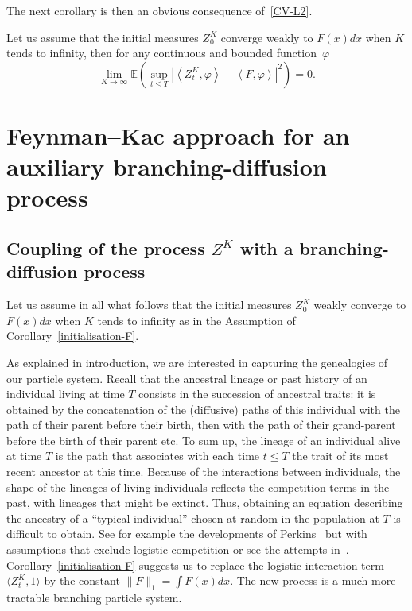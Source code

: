 \documentclass[10pt]{amsart}
\theoremstyle{definition}\newtheorem{defi}[theo]{Definition}\newtheorem{rema}[theo]{Remark}\newtheorem{exam}[theo]{Example}\newtheorem{exem}[theo]{Example}\newtheorem{nota}[theo]{Notation}
\newcommand*\E{\mathbb{E}}
\begin{document}
The next corollary is then an obvious consequence of~\eqref{CV-L2}.
\begin{coro}\label{initialisation-F}
Let us assume that the initial measures $Z^{K}_{0}$ converge weakly to $F(x)dx$ when $K$ tends to infinity, then for any continuous and bounded function~$\varphi$
\begin{equation}\label{CV-F}
\lim_{K \to \infty}\E\left(\sup_{t \le T} \left|\left\langle Z^{K}_{t},\varphi\right\rangle - \left\langle F,\varphi\right\rangle\right|^2\right) = 0.
\end{equation}
\end{coro}

\section{Feynman--Kac approach for an auxiliary branching-diffusion process}\label{sec:Feynman-Kac}
\subsection{Coupling of the process \texorpdfstring{$Z^K$}{ZK} with a branching-diffusion process}\label{sec:coupling}


Let us assume in all what follows that the initial measures $Z^{K}_{0}$ weakly converge to $F(x)dx$ when $K$ tends to infinity as in the Assumption of Corollary~\ref{initialisation-F}.


As explained in introduction, we are interested in capturing the genealogies of our particle system. Recall that the ancestral lineage or past history of an individual living at time $T$ consists in the succession of ancestral traits: it is obtained by the concatenation of the (diffusive) paths of this individual with the path of their parent before their birth, then with the path of their grand-parent before the birth of their parent etc. To sum up, the lineage of an individual alive at time $T$ is the path that associates with each time $t\leq T$ the trait of its most recent ancestor at this time. Because of the interactions between individuals, the shape of the lineages of living individuals reflects the competition terms in the past, with lineages that might be extinct. Thus, obtaining an equation describing the ancestry of a ``typical individual'' chosen at random in the population at $T$ is difficult to obtain. See for example the developments of Perkins~\cite{perkinsAMS} but with assumptions that exclude logistic competition or see the attempts in~\cite{meleardtran_suphist}. Corollary~\ref{initialisation-F} suggests us to replace the logistic interaction term $ \langle Z^{K}_{t},1\rangle$ by the constant $\|F\|_1 = \int F(x)dx$. The new process is a much more tractable branching particle system.
\end{document}
